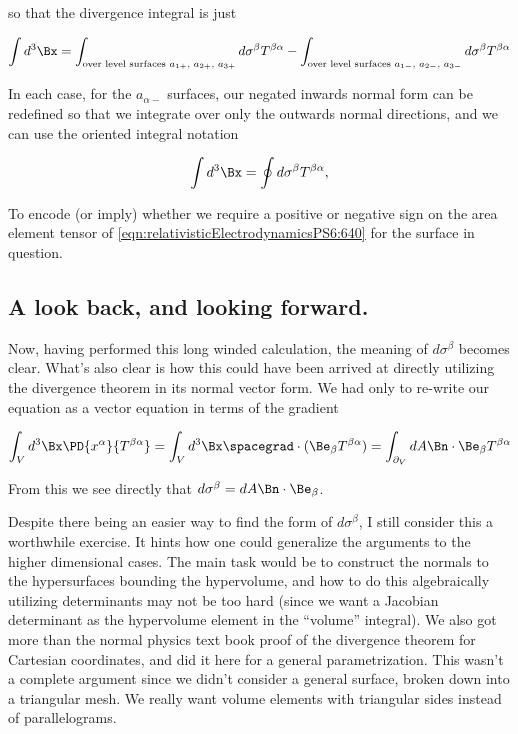 so that the divergence integral is just

\begin{equation}\label{eqn:relativisticElectrodynamicsPS6:560}
\int d^3 \Bx = 
\int_{\text{over level surfaces $a_{1+}$, $a_{2+}$, $a_{3+}$}} d \sigma^\beta T^{\beta \alpha}
-\int_{\text{over level surfaces $a_{1-}$, $a_{2-}$, $a_{3-}$}} d \sigma^\beta T^{\beta \alpha}
\end{equation}

In each case, for the $a_{\alpha-}$ surfaces, our negated inwards normal form can be redefined so that we integrate over only the outwards normal directions, and we can use the oriented integral notation

\begin{equation}\label{eqn:relativisticElectrodynamicsPS6:580}
\int d^3 \Bx = \oint d \sigma^\beta T^{\beta \alpha},
\end{equation}

To encode (or imply) whether we require a positive or negative sign on the area element tensor of \ref{eqn:relativisticElectrodynamicsPS6:640} for the surface in question.

\subsection{A look back, and looking forward.}

Now, having performed this long winded calculation, the meaning of $d \sigma^\beta$ becomes clear.  What's also clear is how this could have been arrived at directly utilizing the divergence theorem in its normal vector form.  We had only to re-write our equation as a vector equation in terms of the gradient

\begin{equation}\label{eqn:relativisticElectrodynamicsPS6:600}
\int_V d^3 \Bx \PD{x^\alpha}{T^{\beta \alpha}} = \int_V d^3 \Bx \spacegrad \cdot (\Be_\beta T^{\beta \alpha}) = \int_{\partial_V} dA \Bn \cdot \Be_\beta T^{\beta \alpha}
\end{equation}

From this we see directly that $d\sigma^\beta = dA \Bn \cdot \Be_\beta$.

Despite there being an easier way to find the form of $d\sigma^\beta$, I still consider this a worthwhile exercise.  It hints how one could generalize the arguments to the higher dimensional cases.  The main task would be to construct the normals to the hypersurfaces bounding the hypervolume, and how to do this algebraically utilizing determinants may not be too hard (since we want a Jacobian determinant as the hypervolume element in the ``volume'' integral).  We also got more than the normal physics text book proof of the divergence theorem for Cartesian coordinates, and did it here for a general parametrization.  This wasn't a complete argument since we didn't consider a general surface, broken down into a triangular mesh.  We really want volume elements with triangular sides instead of parallelograms.

\EndArticle
